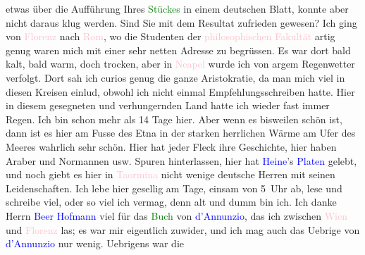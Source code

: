                     etwas über die Aufführung Ihres \textcolor{green}{Stückes}{} in
                    einem deutschen Blatt, konnte aber nicht daraus klug werden. Sind Sie mit dem
                    Resultat zufrieden gewesen?\pend
           \pstart
           Ich ging von \textcolor{pink}{Florenz}{}\ledrightnote{\textcolor{pink}{Florenz}} nach \textcolor{pink}{Rom}{}\ledrightnote{\textcolor{pink}{Rom}}, wo die Studenten der \textcolor{pink}{philosophischen Fakultät}{}\ledrightnote{\textcolor{pink}{Universität La Sapienza}} artig genug waren mich mit einer sehr
                    netten Adresse zu begrüssen. Es war dort bald kalt, bald warm, doch trocken,
                    aber in \textcolor{pink}{Neapel}{}\ledrightnote{\textcolor{pink}{Neapel}} wurde ich von argem
                    Regenwetter verfolgt. Dort sah ich curios genug die ganze Aristokratie, da man
                    mich {\pb}viel in diesen Kreisen
                    einlud, obwohl ich nicht einmal Empfehlungsschreiben hatte.\pend
           \pstart
           Hier in diesem gesegneten und verhungernden Land hatte ich wieder fast immer
                    Regen. Ich bin schon mehr als 14 Tage hier. Aber wenn es bisweilen schön ist,
                    dann ist es hier am Fusse des Etna in der
                    starken herrlichen Wärme am Ufer des Meeres wahrlich sehr schön. Hier hat jeder
                    Fleck ihre Geschichte, hier haben Araber und Normannen usw. Spuren hinterlassen,
                    hier hat \textcolor{blue}{Heine}{}\ledrightnote{\textcolor{blue}{Heinrich Heine}}’s \textcolor{blue}{Platen}{}\ledrightnote{\textcolor{blue}{August von Platen}} gelebt, und noch giebt es hier in \textcolor{pink}{Taormina}{}\ledrightnote{\textcolor{pink}{Taormina}} nicht wenige deutsche Herren mit seinen
                    Leidenschaften.\pend
           \pstart
           Ich lebe hier gesellig am Tage, einsam {\pb}von 5 Uhr ab, lese und
                    schreibe viel, oder so viel ich vermag, denn alt und dumm bin ich.\pend
           \pstart
           Ich danke Herrn \textcolor{blue}{Beer Hofmann}{}\ledrightnote{\textcolor{blue}{Richard Beer-Hofmann}} viel für das \textcolor{green}{Buch}{} von \textcolor{blue}{d’Annunzio}{}\ledrightnote{\textcolor{blue}{Gabriele D’Annunzio}}, das ich zwischen \textcolor{pink}{Wien}{}\ledrightnote{\textcolor{pink}{Wien}} und \textcolor{pink}{Florenz}{}\ledrightnote{\textcolor{pink}{Florenz}} las; es
                    war mir eigentlich zuwider, und ich mag auch das Uebrige von \textcolor{blue}{d’Annunzio}{}\ledrightnote{\textcolor{blue}{Gabriele D’Annunzio}} nur wenig. Uebrigens war die
